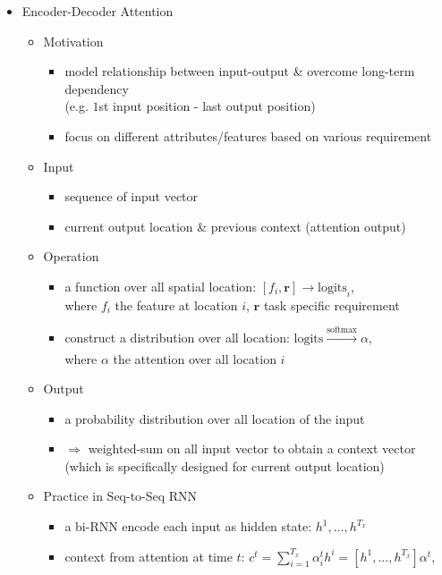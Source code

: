 \begin{itemize}
\item Encoder-Decoder Attention
	\begin{itemize}
	\item Motivation
		\begin{itemize}
		\item model relationship between input-output \& overcome long-term dependency \\ 
		(e.g. $1$st input position - last output position)
		\item focus on different attributes/features based on various requirement
		\end{itemize}
	\item Input
		\begin{itemize}
		\item sequence of input vector 
		\item current output location \& previous context (attention output)
		\end{itemize}
	\item Operation
		\begin{itemize}
		\item a function over all spatial location: $[f_i, \mathbf r]\rightarrow \text{logits}_i$, \\ 
		where $f_i$ the feature at location $i$, $\mathbf r$ task specific requirement
		\item construct a distribution over all location: $\text{logits} \xrightarrow[]{\text{softmax}} \alpha$, \\
		where $\alpha$ the attention over all location $i$
		\end{itemize}
	\item Output
		\begin{itemize}
		\item a probability distribution over all location of the input
		\item $\Rightarrow$ weighted-sum on all input vector to obtain a context vector \\
		(which is specifically designed for current output location)
		\end{itemize}
	\item Practice in Seq-to-Seq RNN
		\begin{itemize}
		\item a bi-RNN encode each input as hidden state: $h^1,...,h^{T_x}$
		\item context from attention at time $t$: $\displaystyle c^t=\sum_{i=1}^{T_x}\alpha^t_i h^i = [h^1,...,h^{T_x}]\alpha^t$, \\

\end{itemize}
\end{itemize}
\end{itemize}
